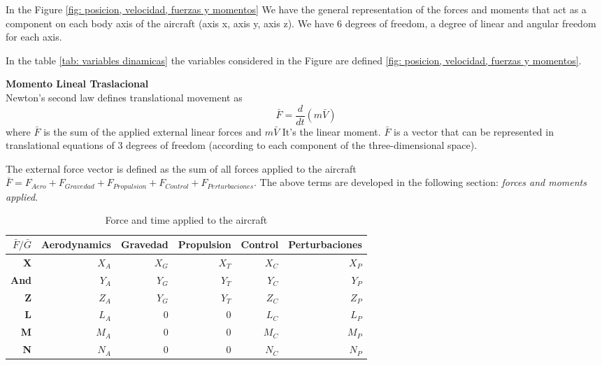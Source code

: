 In the Figure \ref{fig: posicion, velocidad, fuerzas y momentos} We have the general representation of the forces and moments that act as a component on each body axis of the aircraft (axis x, axis y, axis z). We have 6 degrees of freedom, a degree of linear and angular freedom for each axis.  

In the table \ref{tab: variables dinamicas} the variables considered in the Figure are defined \ref{fig: posicion, velocidad, fuerzas y momentos}.

\medskip

\textbf{Momento Lineal Traslacional}\\
Newton's second law defines translational movement as
\begin{equation}
\bar{F} = \frac{d}{dt}(m \bar{V})
\end{equation}
where $\bar{F}$ is the sum of the applied external linear forces and $m \bar{V}$ It's the linear moment.
$\bar{F}$ is a vector that can be represented in translational equations of 3 degrees of freedom (according to each component of the three-dimensional space).

The external force vector is defined as the sum of all forces applied to the aircraft $\bar{F}=F_{Aero}+F_{Gravedad}+F_{Propulsion}+F_{Control}+F_{Perturbaciones}$. The above terms are developed in the following section: \textit{forces and moments applied}.

\begin{table}[!h]
\caption{Force and time applied to the aircraft}
\centering
\begin{tabular}{|r|r|r|r|r|r|}
     \hline
     $\bar{F}/\bar{G}$ & Aerodynamics & Gravedad & Propulsion & Control & Perturbaciones \\
     \hline
     \textbf{X} & $X_{A}$ & $X_{G}$ & $X_{T}$ & $X_{C}$ & $X_{P}$ \\
     \hline
     \textbf{And} & $Y_{A}$ & $Y_{G}$ & $Y_{T}$ & $Y_{C}$ & $Y_{P}$ \\
     \hline
     \textbf{Z} & $Z_{A}$ & $Y_{G}$ & $Y_{T}$ & $Z_{C}$ & $Z_{P}$ \\
     \hline
     \textbf{L} & $L_{A}$ & 0 & 0 & $L_{C}$ & $L_{P}$ \\
     \hline
     \textbf{M} & $M_{A}$ & 0 & 0 & $M_{C}$ & $M_{P}$ \\
     \hline
      \textbf{N} & $N_{A}$ & 0 & 0 & $N_{C}$ & $N_{P}$ \\
     \hline
\end{tabular}
\end{table}

